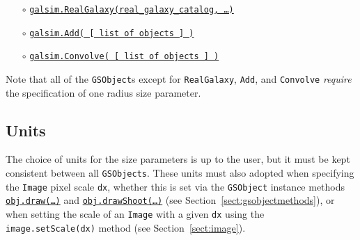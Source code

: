 \documentclass[preprint,11pt]{aastex}
\begin{document}
\begin{itemize}
\item[$\circ$]
  \href{http://galsim-developers.github.com/GalSim/classgalsim_1_1base_1_1_real_galaxy.html}{\texttt{galsim.RealGalaxy(real\_galaxy\_catalog,
      \dots)}} 
\item[$\circ$]
  \href{http://galsim-developers.github.com/GalSim/classgalsim_1_1base_1_1_add.html}{\texttt{galsim.Add( [ list of objects ] )}}
\item[$\circ$]
  \href{http://galsim-developers.github.com/GalSim/classgalsim_1_1base_1_1_convolve.html}{\texttt{galsim.Convolve( [ list of objects ] )}}
\end{itemize}

Note that all of the \texttt{GSObject}s except for \texttt{RealGalaxy}, \texttt{Add}, and
\texttt{Convolve} {\em require} the specification of one radius size
parameter. 

\subsection{Units}
The choice of units for the size parameters is up to the user,
but it must be kept consistent between all \texttt{GSObjects}.  These
units must also adopted when specifying the \texttt{Image} pixel
scale \texttt{dx}, whether this is set via the \texttt{GSObject}
instance methods \href{http://galsim-developers.github.com/GalSim/classgalsim_1_1base_1_1_g_s_object.html#ae0b346a8b438dedbc7f60a52220869d8}{\texttt{obj.draw(\dots)}}
and
\href{http://galsim-developers.github.com/GalSim/classgalsim_1_1base_1_1_g_s_object.html#a42ac334d2840ba3fa832988e998beca0}{\texttt{obj.drawShoot(\dots)}}
(see Section~\ref{sect:gsobjectmethods}),
or when setting the scale of an \texttt{Image} with a given
\texttt{dx} using the \texttt{image.setScale(dx)} method (see Section~\ref{sect:image}).
\end{document}
